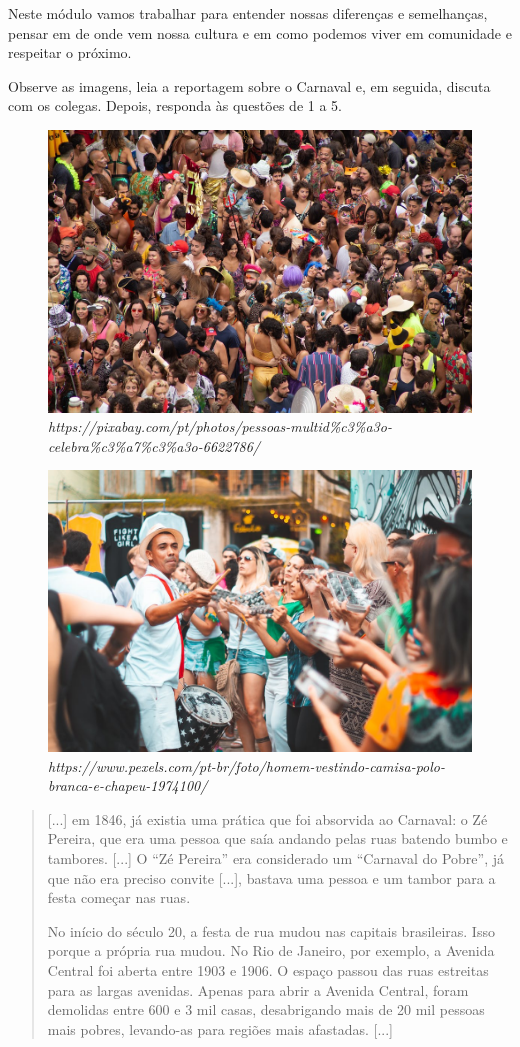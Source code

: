 \begin{itemize}
\begin{itemize}
\begin{itemize}
{Neste módulo vamos trabalhar para entender nossas diferenças e
semelhanças, pensar em de onde vem nossa cultura e em como podemos viver em
comunidade e respeitar o próximo.}


Observe as imagens, leia a reportagem sobre o Carnaval e, em seguida,
discuta com os colegas. Depois, responda às questões de 1 a 5.

\begin{figure}[htpb!]
\includegraphics[width=.5\textwidth]{./imgs/img39.png}
\caption{\emph{https://pixabay.com/pt/photos/pessoas-multid\%c3\%a3o-celebra\%c3\%a7\%c3\%a3o-6622786/}}
\end{figure}

\begin{figure}[htpb!]
\includegraphics[width=.5\textwidth]{./imgs/img40.png}
\caption{\emph{https://www.pexels.com/pt-br/foto/homem-vestindo-camisa-polo-branca-e-chapeu-1974100/} }
\end{figure}

\begin{quote}
[...] em 1846, já existia uma prática que foi absorvida ao Carnaval: o Zé
Pereira, que era uma pessoa que saía andando pelas ruas batendo bumbo e
tambores. [...] O ``Zé
Pereira'' era considerado um ``Carnaval do Pobre'', já que não era
preciso convite [...], bastava uma pessoa e um tambor
para a festa começar nas ruas.

No início do século 20, a festa de rua mudou nas capitais brasileiras.
Isso porque a própria rua mudou. No Rio de Janeiro, por exemplo, a
Avenida Central foi aberta entre 1903 e 1906. O espaço passou das ruas
estreitas para as largas avenidas. Apenas para abrir a Avenida Central,
foram demolidas entre 600 e 3 mil casas, desabrigando mais de 20 mil
pessoas mais pobres, levando-as para regiões mais afastadas. [...]


\end{quote}
\end{itemize}
\end{itemize}
\end{itemize}
